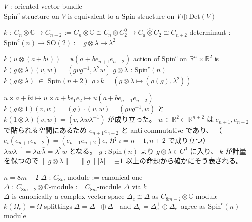 \begin{Theorem}
\itemprop
  \For \(V\) : oriented vector bundle \\
  \Then \(\text{Spin}^c\)-structure on \(V\) is equivalent to a \(\text{Spin}\)-structure on \(V \oplus \text{Det}(V)\)
\end{Theorem}

\begin{Definition}
\itemdefi
  \Define \(k\) : \(C_n \otimes \mathbb{C} \to C_{n+2}\) := \(C_n \otimes \mathbb{C} \cong C_n \otimes C_2^0 \to C_n \hat{\otimes} C_2 \cong C_{n+2}\)
\itemdefi
  \Define determinant : \(\text{Spin}^c(n) \to \text{SO}(2)\) := \(g \otimes \lambda \mapsto \lambda^2\)
\end{Definition}

\begin{Theorem}
\itemprop
  \Then \(k(u \otimes (a + bi)) = u(a + b e_{n+1} e_{n+2})\)
\itemprop
  \Then action of \(\text{Spin}^c\) on \(\mathbb{R}^{n} \times \mathbb{R}^2\) is \(k(g \otimes \lambda)(v,w) = (g v g^{-1} , \lambda^2 w)\)
\itemprop
  \For \(g \otimes \lambda\) : \(\text{Spin}^c(n)\) \\
  \Then \(k(g \otimes \lambda)\) \(\in\) \(\text{Spin}(n+2)\)
\itemprop
  \Then \(\rho \circ k = (g \otimes \lambda \mapsto (\rho(g), \lambda^2))\)
\end{Theorem}

\begin{Proof}
\itemprof
  \(u \times a + bi \mapsto u \times a + b e_1 e_2 \mapsto u (a + b e_{n+1} e_{n+2})\)
\itemprof
  \(k(g \otimes 1)(v,w) = (g) \cdot (v,w) = (g v g^{-1}, w)\) と \(k(1 \otimes \lambda)(v,w) = (v , \lambda w \lambda^{-1})\) が成り立った。
  \(w \in \mathbb{R}^2 \subset \mathbb{R}^{n+2}\) は \(e_{n+1} , e_{n+2}\) で貼られる空間にあるため \(e_{n+1} e_{n+2}\) と anti-commutative であり、 （ \(e_i (e_{n+1} e_{n+2}) = (e_{n+1} e_{n+2}) e_{i}\) が \(i=n+1,n+2\) で成り立つ） \(\lambda w \lambda^{-1} = \lambda w \bar{\lambda} = \lambda^2 w\) となる。
\itemprof
  \(g\) : \(\text{Spin}(n)\) より \(g \otimes \lambda \in C^0\) に入り、 \(k\) が計量を保つので \(\lVert g \otimes \lambda \rVert = \lVert g \rVert \lvert \lambda \rvert = \pm 1\)
\itemprof
  以上の命題から確かにそう表される。
\end{Proof}

\begin{Theorem}
\itemwhen \(n = 8m - 2\)
\itemprop
  \Let \(\Delta\) : \(C_{8m}\)-module := canonical one \\
  \Let \(\Delta\) : \(C_{8m-2} \otimes \mathbb{C}\)-module := \(C_{8m}\)-module \(\Delta\) via \(k\) \\
  \Then \(\Delta\) is canonically a complex vector space
\itemprop
  \Then \(\Delta_c \cong \Delta\) as \(C_{8m-2} \otimes \mathbb{C}\)-module
  \Then \(k(\Omega_c) = \Omega\)
\itemprop
  \Then splittings \(\Delta = \Delta^+ \oplus \Delta^-\) and \(\Delta_c = \Delta_c^+ \oplus \Delta_c^-\) agree as \(\text{Spin}^c(n)\)-module
\end{Theorem}

